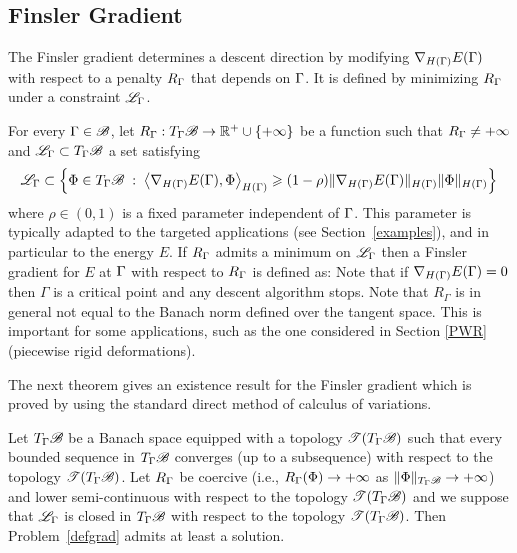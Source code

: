 \subsection{Finsler Gradient}

The Finsler gradient determines a descent direction by modifying $\nabla_{H(\Gamma)} E(\Gamma)$ with respect to a penalty $R_\Gamma$ that  depends on $\Gamma$. It is defined by minimizing $R_\Gamma$ under a constraint $\mathcal{L}_\Gamma$. 


\begin{defn} \label{FinslerGrad}
For every $\Gamma \in \mathcal{B}$, let $R_\Gamma : T_\Gamma\mathcal{B} \rightarrow {\mathbb R}^+\cup\{+\infty\}$ be a function such that  $R_\Gamma \neq +\infty$ and  $\mathcal{L}_\Gamma \subset T_\Gamma\mathcal{B}$  a   set satisfying
\begin{equation}\label{cond-constraints}
	\mathcal{L}_\Gamma \subset \left\{ 
		 	\Phi \in T_\Gamma\mathcal{B}
		 \;:\;  
			\left\langle \nabla_{H(\Gamma)}E (\Gamma) , \Phi \right\rangle_{H(\Gamma)} \geqslant (1-\rho) \|\nabla_{H(\Gamma)}E (\Gamma)\|_{H(\Gamma)} \|\Phi \|_{H(\Gamma)}
		  \right\} \,
\end{equation}
where $\rho \in (0,1)$ is a fixed parameter independent of $\Gamma$. This parameter is typically adapted to the targeted applications (see Section~\ref{examples}), and in particular to the energy $E$. If $R_\Gamma$ admits a minimum on $\mathcal{L}_\Gamma$ then  a Finsler  gradient for $E$ at $\Gamma$ with respect to $R_\Gamma$ is defined as: 
Note that if $ \nabla_{H(\Gamma)}E (\Gamma)=0$ then $\Gamma$ is a critical point and any descent algorithm  stops. Note that $R_\Gamma$ is in general not equal to the Banach norm defined over the tangent space. This is important for some applications, such as the one considered in Section \ref{PWR} (piecewise rigid deformations).
\end{defn}	

\par The next theorem gives an existence result for the Finsler gradient which is proved by using the standard  direct method of  calculus of variations. 

\begin{thm}\label{general-existence} Let $T_\Gamma\mathcal{B}$ be a Banach space equipped with a topology $\mathcal{T}(T_\Gamma\mathcal{B})$ such that every bounded sequence  in $T_\Gamma\mathcal{B}$ converges (up to a subsequence) with respect to the topology $\mathcal{T}(T_\Gamma\mathcal{B})$.  Let $R_\Gamma$ be  coercive (i.e., $R_\Gamma(\Phi)\rightarrow +\infty$ as $\|\Phi\|_{T_\Gamma\mathcal{B}}\rightarrow +\infty$) and lower  semi-continuous with respect to the topology $\mathcal{T}(T_\Gamma\mathcal{B})$ and we suppose that $\mathcal{L}_\Gamma$ is closed in $T_\Gamma\mathcal{B}$ with respect to the topology $\mathcal{T}(T_\Gamma\mathcal{B})$. Then Problem~\eqref{defgrad} admits at least a solution.
\end{thm}

